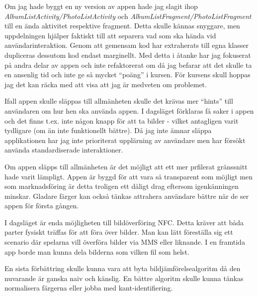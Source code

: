 \documentclass[11px, a4paper]{article}
\begin{document}
	Om jag hade byggt en ny version av appen hade jag slagit ihop \emph{AlbumListActivity/PhotoListActivity} och \emph{AlbumListFragment/PhotoListFragment} till en ända aktivitet respektive fragment. Detta skulle kännas snyggare, men uppdelningen hjälper faktiskt till att separera vad som ska hända vid användarinteraktion. Genom att gemensam kod har extraherats till egna klasser dupliceras dessutom kod endast marginellt. Med detta i åtanke har jag fokuserat på andra delar av appen och inte refaktorerat om då jag befarar att det skulle ta en ansenlig tid och inte ge så mycket ``poäng'' i kursen. För kursens skull hoppas jag det kan räcka med att visa att jag är medveten om problemet.

	Ifall appen skulle släppas till allmänheten skulle det krävas mer ``hints'' till användaren om hur hen ska använda appen. I dagsläget förklaras få saker i appen och det finns t.ex. inte någon knapp för att ta bilder - vilket antagligen varit tydligare (om än inte funktionellt bättre). Då jag inte ämnar släppa applikationen har jag inte prioriterat upplärning av användare men har försökt använda standardiserade interaktioner.

	Om appen släpps till allmänheten är det möjligt att ett mer prfilerat gränssnitt hade varit lämpligt. Appen är byggd för att vara så transparent som möjligt men som marknadsföring är detta troligen ett dåligt drag eftersom igenkänningen minskar. Gladare färger kan också tänkas attrahera användare bättre när de ser appen för första gången.

	I dagsläget är enda möjligheten till bildöverföring NFC. Detta kräver att båda parter fysiskt träffas för att föra över bilder. Man kan lätt föreställa sig ett scenario där spelarna vill överföra bilder via MMS eller liknande. I en framtida app borde man kunna dela bilderna som vilken fil som helst.

	En sista förbättring skulle kunna vara att byta bildjämförelsealgoritm då den nuvarande är ganska naiv och känslig. En bättre algoritm skulle kunna tänkas normalisera färgerna eller jobba med kant-identifiering.



\begingroup
\raggedright


\endgroup
\end{document}

